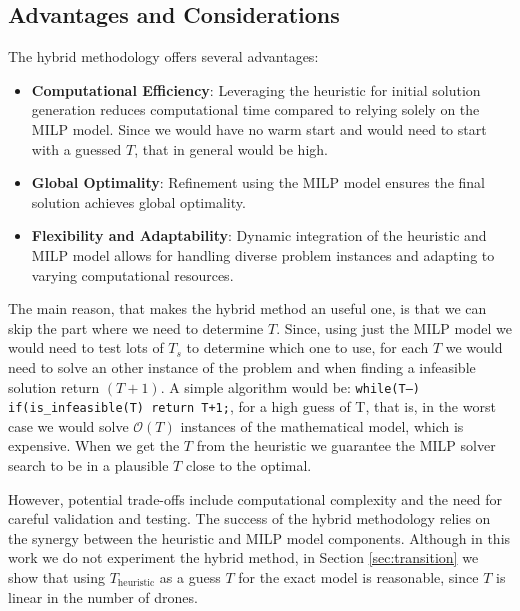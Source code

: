 \subsection{Advantages and Considerations}

The hybrid methodology offers several advantages:

\begin{itemize}
  \item \textbf{Computational Efficiency}: Leveraging the heuristic for initial solution generation reduces computational time compared to relying solely on the MILP model. Since we would have no warm start and would need to start with a guessed $T$, that in general would be high.
  \item \textbf{Global Optimality}: Refinement using the MILP model ensures the final solution achieves global optimality.
  \item \textbf{Flexibility and Adaptability}: Dynamic integration of the heuristic and MILP model allows for handling diverse problem instances and adapting to varying computational resources.
\end{itemize}

The main reason, that makes the hybrid method an useful one, is that we can skip the part where we need to determine $T$. Since, using just the MILP model we would need to test lots of $T_s$ to determine which one    to use, for each $T$ we would need to solve an other instance of the problem and when finding a infeasible solution return $(T+1)$. A simple algorithm would be: \texttt{while(T--){ if(is_infeasible(T) return T+1;}}, for a high guess of T, that is, in the worst case we would solve $\mathcal{O}(T)$ instances of the mathematical model, which is expensive. When we get the $T$ from the heuristic we guarantee the MILP solver search to be in a plausible $T$ close to the optimal.

However, potential trade-offs include computational complexity and the need for careful validation and testing. The success of the hybrid methodology relies on the synergy between the heuristic and MILP model components.  Although in this work we do not experiment the hybrid method, in Section \ref{sec:transition} we show that using $T_{\text{heuristic}}$ as a guess $T$ for the exact model is reasonable, since $T$ is linear in the number of drones.




